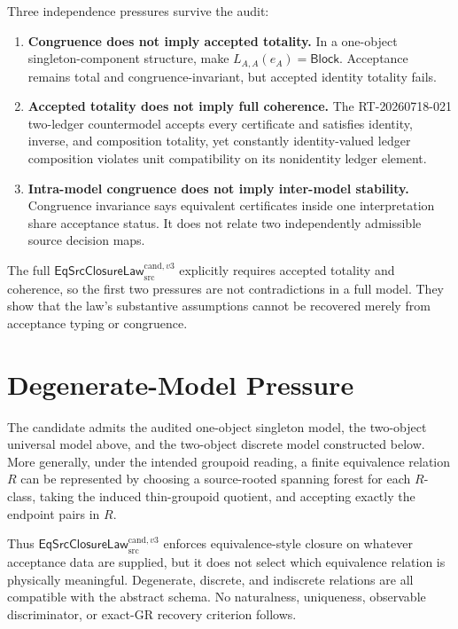 \documentclass[11pt]{article}
\newcommand{\Law}{\mathsf{EqSrcClosureLaw}^{\mathrm{cand},v3}_{\mathrm{src}}}
\newcommand{\Block}{\mathsf{Block}}
\begin{document}
Three independence pressures survive the audit:
\begin{enumerate}[leftmargin=*]
  \item \textbf{Congruence does not imply accepted totality.}
  In a one-object singleton-component structure, make
  \(L_{A,A}(e_A)=\Block\). Acceptance remains total and congruence-invariant,
  but accepted identity totality fails.

  \item \textbf{Accepted totality does not imply full coherence.}
  The RT-20260718-021 two-ledger countermodel accepts every certificate and
  satisfies identity, inverse, and composition totality, yet constantly
  identity-valued ledger composition violates unit compatibility on its
  nonidentity ledger element.

  \item \textbf{Intra-model congruence does not imply inter-model stability.}
  Congruence invariance says equivalent certificates inside one interpretation
  share acceptance status. It does not relate two independently admissible
  source decision maps.
\end{enumerate}

The full \(\Law\) explicitly requires accepted totality and coherence, so the
first two pressures are not contradictions in a full model. They show that the
law's substantive assumptions cannot be recovered merely from acceptance
typing or congruence.

\section{Degenerate-Model Pressure}

The candidate admits the audited one-object singleton model, the two-object
universal model above, and the two-object discrete model constructed below.
More generally, under the intended groupoid reading, a finite equivalence
relation \(R\) can be represented by choosing a source-rooted spanning forest
for each \(R\)-class, taking the induced thin-groupoid quotient, and accepting
exactly the endpoint pairs in \(R\).

Thus \(\Law\) enforces equivalence-style closure on whatever acceptance data
are supplied, but it does not select which equivalence relation is physically
meaningful. Degenerate, discrete, and indiscrete relations are all compatible
with the abstract schema. No naturalness, uniqueness, observable
discriminator, or exact-GR recovery criterion follows.
\end{document}
